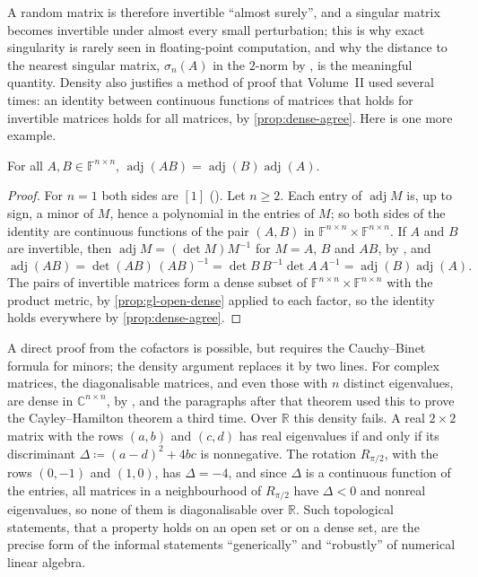 A random matrix is therefore invertible ``almost surely'', and a singular matrix becomes invertible under almost every small perturbation; this is why exact singularity is rarely seen in floating-point computation, and why the distance to the nearest singular matrix, $\sigma_n(A)$ in the $2$-norm by , is the meaningful quantity. Density also justifies a method of proof that Volume~II used several times: an identity between continuous functions of matrices that holds for invertible matrices holds for all matrices, by \cref{prop:dense-agree}. Here is one more example.

\begin{proposition}
\label{prop:adjugate-product}
For all $A,B\in\mathbb F^{n\times n}$, $\operatorname{adj}(AB)=\operatorname{adj}(B)\operatorname{adj}(A)$.
\end{proposition}

\begin{proof}
For $n=1$ both sides are $[1]$ (). Let $n\ge2$. Each entry of $\operatorname{adj}M$ is, up to sign, a minor of $M$, hence a polynomial in the entries of $M$; so both sides of the identity are continuous functions of the pair $(A,B)$ in $\mathbb F^{n\times n}\times\mathbb F^{n\times n}$. If $A$ and $B$ are invertible, then $\operatorname{adj}M=(\det M)M^{-1}$ for $M=A$, $B$ and $AB$, by , and
\[
\operatorname{adj}(AB)=\det(AB)\,(AB)^{-1}=\det B\,B^{-1}\det A\,A^{-1}=\operatorname{adj}(B)\operatorname{adj}(A).
\]
The pairs of invertible matrices form a dense subset of $\mathbb F^{n\times n}\times\mathbb F^{n\times n}$ with the product metric, by \cref{prop:gl-open-dense} applied to each factor, so the identity holds everywhere by \cref{prop:dense-agree}.
\end{proof}

A direct proof from the cofactors is possible, but requires the Cauchy--Binet formula for minors; the density argument replaces it by two lines. For complex matrices, the diagonalisable matrices, and even those with $n$ distinct eigenvalues, are dense in $\mathbb C^{n\times n}$, by , and the paragraphs after that theorem used this to prove the Cayley--Hamilton theorem a third time. Over $\mathbb R$ this density fails. A real $2\times2$ matrix with the rows $(a,b)$ and $(c,d)$ has real eigenvalues if and only if its discriminant $\Delta\coloneqq(a-d)^2+4bc$ is nonnegative. The rotation $R_{\pi/2}$, with the rows $(0,-1)$ and $(1,0)$, has $\Delta=-4$, and since $\Delta$ is a continuous function of the entries, all matrices in a neighbourhood of $R_{\pi/2}$ have $\Delta<0$ and nonreal eigenvalues, so none of them is diagonalisable over $\mathbb R$. Such topological statements, that a property holds on an open set or on a dense set, are the precise form of the informal statements ``generically'' and ``robustly'' of numerical linear algebra.

